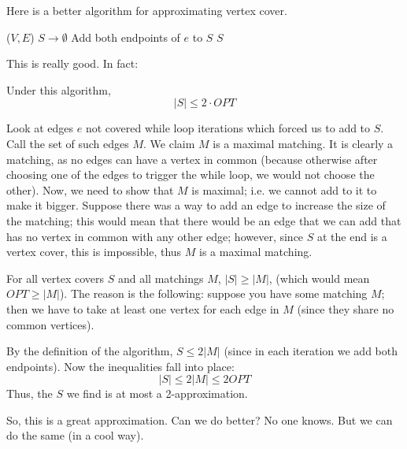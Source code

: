 Here is a better algorithm for approximating vertex cover.
\begin{algothm}
    \begin{algorithmic}
        ($V, E$)
            \State $S \to \emptyset$
                \State Add both endpoints of $e$ to $S$
            \EndWhile
            \State \Return $S$
        \EndFunction
    \end{algorithmic}

    This is really good. In fact:
    \begin{theorem}
        Under this algorithm,
        \[ |S| \leq 2 \cdot OPT \]

        \begin{proof*}
            Look at edges $e$ not covered while loop iterations which forced us to add to $S$. Call the set of such edges $M$. We claim $M$ is a maximal matching.
            It is clearly a matching, as no edges can have a vertex in common (because otherwise after choosing one of the edges to trigger the while loop, we would not choose the other). Now, we
            need to show that $M$ is maximal; i.e. we cannot add to it to make it bigger. Suppose there was a way to add an edge to increase the size of the matching;
            this would mean that there would be an edge that we can add that has no vertex in common with any other edge; however, since $S$ at the end is a vertex cover,
            this is impossible, thus $M$ is a maximal matching.

            For all vertex covers $S$ and all matchings $M$, $|S| \geq |M|$, (which would mean $OPT \geq |M|$). The reason is the following: suppose you have some matching $M$;
            then we have to take at least one vertex for each edge in $M$ (since they share no common vertices).

            By the definition of the algorithm, $S \leq 2 |M|$ (since in each iteration we add both endpoints). Now the inequalities fall into place:
            \[ |S| \leq 2|M| \leq 2 OPT \]
            Thus, the $S$ we find is at most a 2-approximation.
        \end{proof*}
    \end{theorem}
\end{algothm}

So, this is a great approximation. Can we do better? No one knows. But we can do the same (in a cool way).

